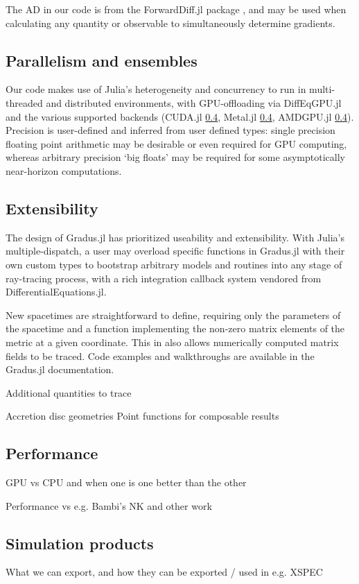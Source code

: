 The AD in our code is from the ForwardDiff.jl package \citep{RevelsLubinPapamarkou2016}, and may be used when calculating any quantity or observable to simultaneously determine gradients.

\subsection{Parallelism and ensembles}

Our code makes use of Julia's heterogeneity and concurrency to run in multi-threaded and distributed environments, with GPU-offloading via DiffEqGPU.jl and the various supported backends (CUDA.jl \ref{}, Metal.jl \ref{}, AMDGPU.jl \ref{}). Precision is user-defined and inferred from user defined types: single precision floating point arithmetic may be desirable or even required for GPU computing, whereas arbitrary precision `big floats' may be required for some asymptotically near-horizon computations.



\subsection{Extensibility}

The design of Gradus.jl has prioritized useability and extensibility. With Julia's multiple-dispatch, a user may overload specific functions in Gradus.jl with their own custom types to bootstrap arbitrary models and routines into any stage of ray-tracing process, with a rich integration callback system vendored from DifferentialEquations.jl.

New spacetimes are straightforward to define, requiring only the parameters of the spacetime and a function implementing the non-zero matrix elements of the metric at a given coordinate. This in also allows numerically computed matrix fields to be traced. Code examples and walkthroughs are available in the Gradus.jl documentation.



Additional quantities to trace

Accretion disc geometries
Point functions for composable results


\subsection{Performance}
\label{sec:performance}

GPU vs CPU and when one is one better than the other

Performance vs e.g. Bambi's NK and other work

\subsection{Simulation products}

What we can export, and how they can be exported / used in e.g. XSPEC

